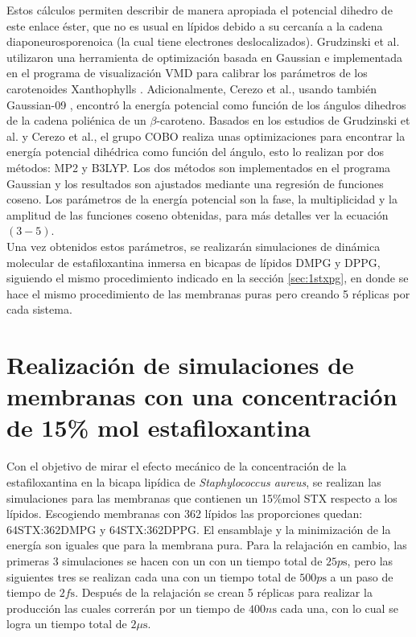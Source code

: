 Estos c\'{a}lculos permiten describir de manera apropiada el potencial dihedro de este enlace \'{e}ster, que no es usual en l\'{i}pidos debido a su cercan\'{i}a a la cadena diaponeurosporenoica (la cual tiene electrones deslocalizados). Grudzinski et al. \cite{Grudzinski2017LocalizationBilayer} utilizaron una herramienta de optimizaci\'{o}n basada en Gaussian e implementada en el programa de visualizaci\'{o}n VMD para calibrar los par\'{a}metros de los carotenoides Xanthophylls \cite{Grudzinski2017LocalizationBilayer}. Adicionalmente, Cerezo et al., usando tambi\'{e}n Gaussian-09 \cite{Cerezo2012AntioxidantSimulations}, encontr\'{o} la energ\'{i}a potencial como funci\'{o}n de los \'{a}ngulos dihedros de la cadena poli\'{e}nica de un $\beta$-caroteno. Basados en los estudios de Grudzinski et al. y Cerezo et al., el grupo COBO realiza unas optimizaciones para encontrar la energ\'{i}a potencial dih\'{e}drica como funci\'{o}n del \'{a}ngulo, esto lo realizan por dos m\'{e}todos: MP2  y B3LYP. Los dos m\'{e}todos son implementados en el programa Gaussian y los resultados son ajustados mediante una regresi\'{o}n de funciones coseno. Los par\'{a}metros de la energ\'{i}a potencial son la fase, la multiplicidad y la amplitud de las funciones coseno obtenidas, para m\'{a}s detalles ver la ecuaci\'{o}n $(3-5)$.\\

Una vez obtenidos estos par\'{a}metros, se realizar\'{a}n simulaciones de din\'{a}mica molecular de estafiloxantina inmersa en bicapas de l\'{i}pidos DMPG y DPPG, siguiendo el mismo procedimiento indicado en la secci\'{o}n \ref{sec:1stxpg}, en donde se hace el mismo procedimiento de las membranas puras pero creando 5 r\'{e}plicas por cada sistema.\\

\section{Realizaci\'{o}n de simulaciones de membranas con una concentraci\'{o}n de 15\% mol estafiloxantina}
Con el objetivo de mirar el efecto mec\'{a}nico de la concentraci\'{o}n de la estafiloxantina en la bicapa lip\'{i}dica de \textit{Staphylococcus aureus}, se realizan las simulaciones para las membranas que contienen un 15\%mol STX respecto a los l\'{i}pidos. Escogiendo membranas con 362 l\'{i}pidos las proporciones quedan: 64STX:362DMPG y 64STX:362DPPG. El ensamblaje y la minimizaci\'{o}n de la energ\'{i}a son iguales que para la membrana pura. Para la relajaci\'{o}n en cambio, las primeras 3 simulaciones se hacen con un con un tiempo total de $25p\mathrm{s}$, pero las siguientes tres se realizan cada una con un tiempo total de $500p\mathrm{s}$ a un paso de tiempo de $2f\mathrm{s}$. Despu\'{e}s de la relajaci\'{o}n se crean 5 r\'{e}plicas para realizar la producci\'{o}n las cuales correr\'{a}n por un tiempo de $400n\mathrm{s}$ cada una, con lo cual se logra un tiempo total de $2\mu\mathrm{s}$.\\


